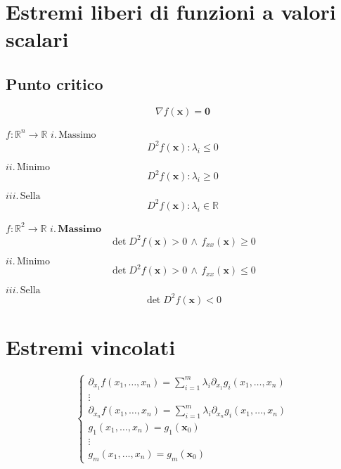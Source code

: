 \documentclass[a4paper,12pt]{report}
\theoremstyle{mystyle}
\begin{document}
\section{Estremi liberi di funzioni a valori scalari}
\subsection{Punto critico}
\[\nabla f (\mathbf{x}) = \mathbf{0}\]


\begin{paragraph}{\(f: \mathbb{R}^n \rightarrow \mathbb{R}\)}
    \(i. \, \text{Massimo}\)
    \[D^2 f (\mathbf{x}) : \lambda_i \leq 0\]

    \(ii. \, \text{Minimo}\)
    \[D^2 f (\mathbf{x}) : \lambda_i \geq 0\]

    \(iii. \, \text{Sella}\)
    \[D^2 f (\mathbf{x}) : \lambda_i \in \mathbb{R}\]
\end{paragraph}

\begin{paragraph}{\(f: \mathbb{R}^2 \rightarrow \mathbb{R}\)}
    \(i. \, \textbf{Massimo}\)
    \[\det D^2 f (\mathbf{x}) > 0 \, \land \, f_{xx} (\mathbf{x}) \geq 0\]

    \(ii. \, \text{Minimo}\)
    \[\det D^2 f (\mathbf{x}) > 0 \, \land \, f_{xx} (\mathbf{x}) \leq 0\]

    \(iii. \, \text{Sella}\)
    \[\det D^2 f (\mathbf{x}) < 0\]
\end{paragraph}




\section{Estremi vincolati}
\[
    \begin{cases}
        \partial_{x_1} f (x_1, \ldots,x_n) = \sum_{i=1}^m \lambda_i \partial_{x_1} g_i(x_1,\ldots, x_n) \\
        \vdots                                                                                          \\
        \partial_{x_n} f (x_1, \ldots,x_n) = \sum_{i=1}^m \lambda_i \partial_{x_n} g_i(x_1,\ldots, x_n) \\
        g_1(x_1, \ldots, x_n) = g_1 (\mathbf{x}_0)                                                      \\
        \vdots                                                                                          \\
        g_m (x_1, \ldots,x_n) = g_m(\mathbf{x}_0)
    \end{cases}
\]
\end{document}
